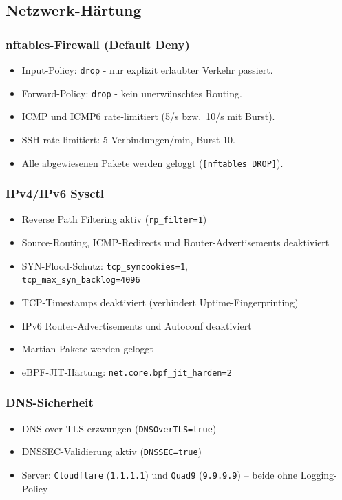 \subsection{Netzwerk-Härtung}
\subsubsection*{nftables-Firewall (Default Deny)}
\begin{itemize}
  \item Input-Policy: \texttt{drop} - nur explizit erlaubter Verkehr passiert.
  \item Forward-Policy: \texttt{drop} - kein unerwünschtes Routing.
  \item \acs{ICMP} und \acs{ICMP}6 rate-limitiert (5/s bzw.\ 10/s mit Burst).
  \item \acs{SSH} rate-limitiert: 5 Verbindungen/min, Burst 10.
  \item Alle abgewiesenen Pakete werden geloggt (\texttt{[nftables DROP]}).
\end{itemize}

\subsubsection*{\acs{IP}v4/\acs{IP}v6 Sysctl}
\begin{itemize}
  \item Reverse Path Filtering aktiv (\texttt{rp\_filter=1})
  \item Source-Routing, ICMP-Redirects und Router-Advertisements deaktiviert
  \item SYN-Flood-Schutz: \texttt{tcp\_syncookies=1},\\ \texttt{tcp\_max\_syn\_backlog=4096}
  \item \acs{TCP}-Timestamps deaktiviert (verhindert Uptime-Fingerprinting)
  \item \acs{IP}v6 Router-Advertisements und Autoconf deaktiviert
  \item Martian-Pakete werden geloggt
  \item \acs{eBPF}-\acs{JIT}-Härtung: \texttt{net.core.bpf\_jit\_harden=2}
\end{itemize}

\subsubsection*{DNS-Sicherheit}
\begin{itemize}
  \item \acs{DNS}-over-\acs{TLS} erzwungen (\texttt{DNSOverTLS=true})
  \item \acs{DNSSEC}-Validierung aktiv (\texttt{DNSSEC=true})
  \item Server:  \texttt{Cloudflare} (\texttt{1.1.1.1}) und \texttt{Quad9} (\texttt{9.9.9.9}) -- beide ohne Logging-Policy
\end{itemize}

